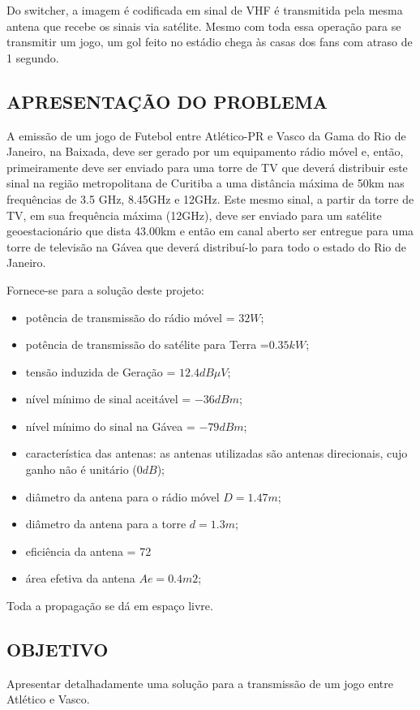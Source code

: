 \documentclass[a4paper,12pt]{article}
\begin{document}
Do switcher, a imagem é codificada em sinal de VHF é transmitida pela
mesma antena que recebe os sinais via satélite. Mesmo com toda essa operação
para se transmitir um jogo, um gol feito no estádio chega às casas dos fans com
atraso de 1 segundo.
 
  \subsection{APRESENTAÇÃO DO PROBLEMA}
A emissão de um jogo de Futebol entre Atlético-PR e Vasco da Gama do Rio
de Janeiro, na Baixada, deve ser gerado por um equipamento rádio móvel e, então,
primeiramente deve ser enviado para uma torre de TV que deverá distribuir este
sinal na região metropolitana de Curitiba a uma distância máxima de 50km nas
frequências de 3.5 GHz, 8.45GHz e 12GHz. Este mesmo sinal, a partir da torre de
TV, em sua frequência máxima (12GHz), deve ser enviado para um satélite
geoestacionário que dista 43.00km e então em canal aberto ser entregue para uma
torre de televisão na Gávea que deverá distribuí-lo para todo o estado do Rio de
Janeiro.

Fornece-se para a solução deste projeto:
\begin{itemize}
 \item  potência de transmissão do rádio móvel = $32W$;
 \item  potência de transmissão do satélite para Terra =$ 0.35kW$;
 \item  tensão induzida de Geração = $12.4 dB \mu V$;
 \item  nível mínimo de sinal aceitável = $-36dBm$;
 \item  nível mínimo do sinal na Gávea = $-79dBm$;
 \item  característica das antenas: as antenas utilizadas são antenas direcionais, cujo ganho não é unitário ($0dB$);
 \item  diâmetro da antena para o rádio móvel $D=1.47m$;
 \item  diâmetro da antena para a torre $d=1.3m$;
 \item  eficiência da antena = 72%
 \item  área efetiva da antena $Ae=0.4m2$;
\end{itemize}
Toda a propagação se dá em espaço livre.
 \subsection{OBJETIVO}
Apresentar detalhadamente uma solução para a transmissão de um jogo
entre Atlético e Vasco.
\end{document}
